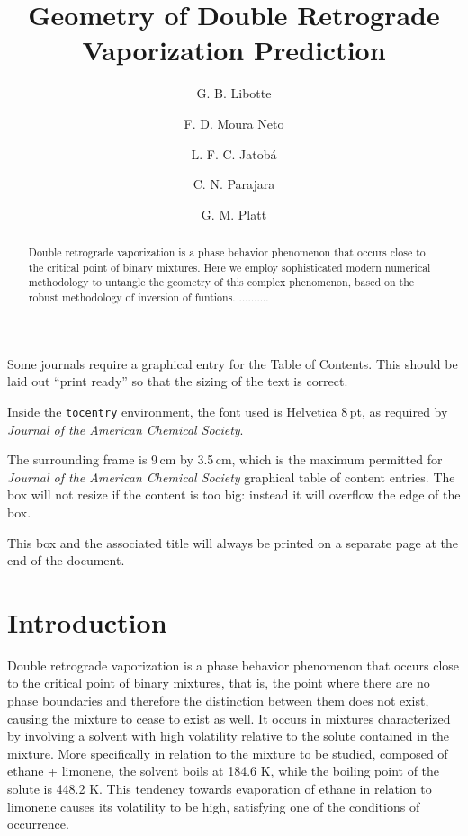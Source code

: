 \documentclass[journal=iecred,manuscript=article]{achemso}
\author{G. B. Libotte}
\author{F. D. Moura Neto}
\author{L. F. C. Jatob\'{a}}
\author{C. N. Parajara}
\author{G. M. Platt}
\affiliation[Unknown University]
{Polytechnic Institute, Rio de Janeiro State University, Nova Friburgo, Brazil}
\title[An \textsf{achemso} demo]
  {Geometry of Double Retrograde Vaporization Prediction}
\theoremstyle{definition}
\theoremstyle{remark}
\begin{document}
\begin{tocentry}

Some journals require a graphical entry for the Table of Contents.
This should be laid out \enquote{print ready} so that the sizing of the
text is correct.

Inside the \texttt{tocentry} environment, the font used is Helvetica
8\,pt, as required by \emph{Journal of the American Chemical
Society}.

The surrounding frame is 9\,cm by 3.5\,cm, which is the maximum
permitted for  \emph{Journal of the American Chemical Society}
graphical table of content entries. The box will not resize if the
content is too big: instead it will overflow the edge of the box.

This box and the associated title will always be printed on a
separate page at the end of the document.

\end{tocentry}

\begin{abstract}
 Double retrograde vaporization is a phase behavior phenomenon 
 that occurs close to the critical point of binary mixtures. 
 Here we employ sophisticated modern numerical methodology to 
 untangle the geometry of this complex phenomenon, based on the
 robust methodology of inversion of funtions.
 ..........
\end{abstract}

\section{Introduction}

Double retrograde vaporization is a phase behavior phenomenon that occurs close to the critical point of binary mixtures, that is, the point where there are no phase boundaries and therefore the distinction between them does not exist, causing the mixture to cease to exist as well. It occurs in mixtures characterized by involving a solvent with high volatility relative to the solute contained in the mixture. More specifically in relation to the mixture to be studied, composed of ethane + limonene, the solvent boils at 184.6 K, while the boiling point of the solute is 448.2 K. This tendency towards evaporation of ethane in relation to limonene causes its volatility to be high, satisfying one of the conditions of occurrence.
\end{document}
